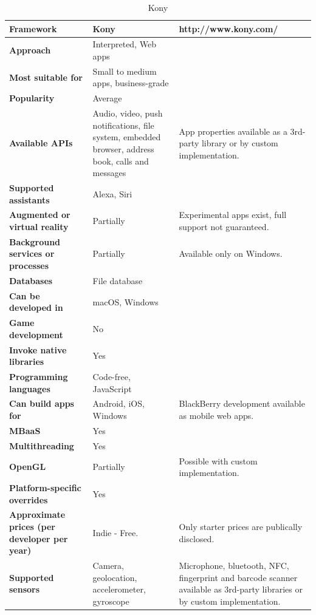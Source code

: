 \documentclass[english,master,public,dept460,male,cpdeclaration,oneside]{diploma}
\begin{document}
\begin{table}[!h]
	\centering
	\caption{Kony}
	\begin{tabular}{p{} | p{} | p{}}
		\toprule		
		\textbf{Framework} & \textbf{Kony} & http://www.kony.com/ \\
		\midrule
		\textbf{Approach} & Interpreted, Web apps & \\			
		\midrule	
		\textbf{Most suitable for} & Small to medium apps, business-grade & \\
		\midrule
		\textbf{Popularity} & Average & \\			
		\midrule
		\textbf{Available APIs} & Audio, video, push notifications, file system, embedded browser, address book, calls and messages & App properties available as a 3rd-party library or by custom implementation. \\			
		\midrule
		\textbf{Supported assistants} & Alexa, Siri & \\			
		\midrule
		\textbf{Augmented or virtual reality} & Partially & Experimental apps exist, full support not guaranteed. \\			
		\midrule
		\textbf{Background services or processes} & Partially & Available only on Windows. \\			
		\midrule
		\textbf{Databases} & File database & \\			
		\midrule
		\textbf{Can be developed in} & macOS, Windows &  \\			
		\midrule
		\textbf{Game development} & No & \\			
		\midrule
		\textbf{Invoke native libraries} & Yes & \\			
		\midrule
		\textbf{Programming languages} & Code-free, JavaScript & \\			
		\midrule
		\textbf{Can build apps for} & Android, iOS, Windows & BlackBerry development available as mobile web apps. \\			
		\midrule
		\textbf{MBaaS} & Yes & \\			
		\midrule
		\textbf{Multithreading} & Yes & \\			
		\midrule
		\textbf{OpenGL} & Partially & Possible with custom implementation. \\			
		\midrule
		\textbf{Platform-specific overrides} & Yes & \\			
		\midrule
		\textbf{Approximate prices (per developer per year)} & Indie - Free. & Only starter prices are publically disclosed. \\			
		\midrule
		\textbf{Supported sensors} & Camera, geolocation, accelerometer, gyroscope & Microphone, bluetooth, NFC, fingerprint and barcode scanner available as 3rd-party libraries or by custom implementation. \\			
		\midrule
	\end{tabular}
\end{table}
\end{document}
